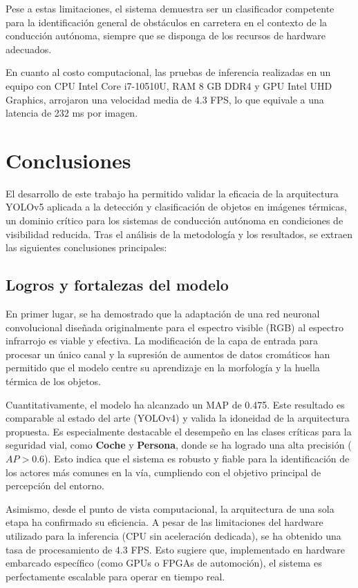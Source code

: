 \documentclass{article}
\begin{document}
Pese a estas limitaciones, el sistema demuestra ser un clasificador competente para la identificación general de obstáculos en carretera en el contexto de la conducción autónoma, siempre que se disponga de los recursos de hardware adecuados.

En cuanto al costo computacional, las pruebas de inferencia realizadas en un equipo con CPU Intel Core i7-10510U, RAM 8 GB DDR4 y GPU Intel UHD Graphics, arrojaron una velocidad media de 4.3 FPS, lo que equivale a una latencia de 232 ms por imagen.

\section{Conclusiones}

El desarrollo de este trabajo ha permitido validar la eficacia de la arquitectura YOLOv5 aplicada a la detección y clasificación de objetos en imágenes térmicas, un dominio crítico para los sistemas de conducción autónoma en condiciones de visibilidad reducida. Tras el análisis de la metodología y los resultados, se extraen las siguientes conclusiones principales:

\subsection{Logros y fortalezas del modelo}
En primer lugar, se ha demostrado que la adaptación de una red neuronal convolucional diseñada originalmente para el espectro visible (RGB) al espectro infrarrojo es viable y efectiva. La modificación de la capa de entrada para procesar un único canal y la supresión de aumentos de datos cromáticos han permitido que el modelo centre su aprendizaje en la morfología y la huella térmica de los objetos.

Cuantitativamente, el modelo ha alcanzado un MAP de 0.475. Este resultado es comparable al estado del arte (YOLOv4) y valida la idoneidad de la arquitectura propuesta. Es especialmente destacable el desempeño en las clases críticas para la seguridad vial, como \textbf{Coche} y \textbf{Persona}, donde se ha logrado una alta precisión ($AP > 0.6$). Esto indica que el sistema es robusto y fiable para la identificación de los actores más comunes en la vía, cumpliendo con el objetivo principal de percepción del entorno.

Asimismo, desde el punto de vista computacional, la arquitectura de una sola etapa ha confirmado su eficiencia. A pesar de las limitaciones del hardware utilizado para la inferencia (CPU sin aceleración dedicada), se ha obtenido una tasa de procesamiento de 4.3 FPS. Esto sugiere que, implementado en hardware embarcado específico (como GPUs o FPGAs de automoción), el sistema es perfectamente escalable para operar en tiempo real.
\end{document}
